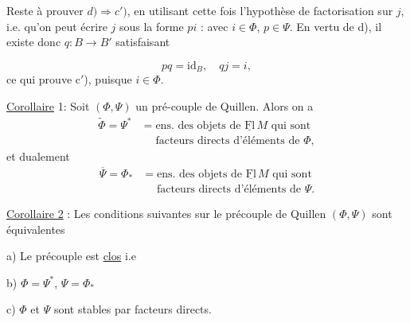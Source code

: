 Reste à prouver $d)\Rightarrow c')$, en utilisant
cette fois l'hypothèse de factorisation sur $j$, i.e.
qu'on peut écrire $j$ sous la forme $pi$ :
avec $i\in\Phi$, $p\in\Psi$. En vertu de
d),  il existe donc $q:B\longrightarrow B'$ satisfaisant

\[
pq=\mathrm{id}_B,\quad qj=i,
\]
ce qui prouve c$'$), puisque $i\in\Phi$.

\uline{Corollaire} 1: Soit $(\Phi,\Psi)$ un pré-couple de Quillen.
Alors on a
\[
\begin{aligned}
\widetilde{\Phi}=\Psi^*&=\text{ens. des objets de }\underline{\mathrm{Fl}}\,M\text{ qui sont}\\
&\phantom{=}\text{facteurs directs d'éléments de }\Phi,
\end{aligned}
\tag*{(4.3.)}
\]
et dualement
\[
\begin{aligned}
\overline{\Psi}=\Phi_*&=\text{ens. des objets de }\underline{\mathrm{Fl}}\,M\text{ qui sont}\\
&\phantom{=}\text{facteurs directs d'éléments de }\Psi.
\end{aligned}
\tag*{(4.4)}
\]

\uline{Corollaire 2} : Les conditions suivantes sur le
précouple de Quillen $(\Phi,\Psi)$ sont équivalentes

a) Le précouple est \uline{clos} i.e  \inserted{$\Phi=\widetilde\Phi$, $\Psi=\overline\Psi$}

b) $\Phi=\Psi^*$, $\Psi=\Phi_*$

c) $\Phi$ et $\Psi$ sont stables par facteurs directs.

